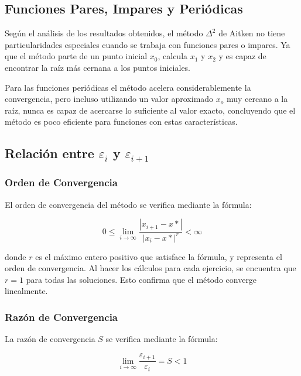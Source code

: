 \documentclass[a4paper,12pt]{article}
\begin{document}
\subsection{Funciones Pares, Impares y Periódicas}

Según el análisis de los resultados obtenidos, el método $\Delta^2$ de Aitken no tiene particularidades especiales cuando se trabaja con funciones pares o impares. Ya que el método parte de un punto inicial $x_0$, calcula $x_1$ y $x_2$ y es capaz de encontrar la raíz más cernana a los puntos iniciales.

Para las funciones periódicas el método acelera considerablemente la convergencia, pero incluso utilizando un valor aproximado $x_o$ muy cercano a la raíz, nunca es capaz de acercarse lo suficiente al valor exacto, concluyendo que el método es poco eficiente para funciones con estas características.

\newpage

\subsection{Relación entre $\varepsilon_i$ y $\varepsilon_{i+1}$} 

\par

\subsubsection{Orden de Convergencia}

El orden de convergencia del método se verifica mediante la fórmula: \par

\[ 0 \leq \lim_{i\to\infty} \frac{|x_{i+1}-x*|}{|x_i-x*|^r} < \infty \]

donde $r$ es el máximo entero positivo que satisface la fórmula, y representa el orden de convergencia. Al hacer los cálculos para cada ejercicio, se encuentra que $r=1$ para todas las soluciones. Esto confirma que el método converge linealmente. \par

\subsubsection{Razón de Convergencia}

La razón de convergencia $S$ se verifica mediante la fórmula: \par

\[ \lim_{i\to\infty} \frac{\varepsilon_{i+1}}{\varepsilon_i} = S < 1\]
\end{document}
